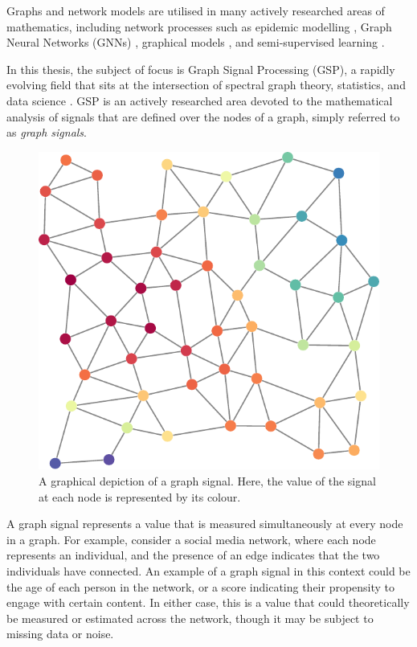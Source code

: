 Graphs and network models are utilised in many actively researched areas of mathematics, including network processes such as epidemic modelling \citep{Pare2020}, Graph Neural Networks (GNNs) \citep{Zhou2020}, graphical models \citep{Holmes2008}, and semi-supervised learning \citep{Chong2020}.

\vspace{0.1cm}

In this thesis, the subject of focus is Graph Signal Processing (GSP), a rapidly evolving field that sits at the intersection of spectral graph theory, statistics, and data science \citep{Ortega2018}. GSP is an actively researched area devoted to the mathematical analysis of signals that are defined over the nodes of a graph, simply referred to as \textit{graph signals}. \phantom{In this thesis we are  }

\newpage

\begin{figure}
	\centering
		\includegraphics[width=\linewidth]{Figures/graph_signal_plot.pdf}
	\caption[A graphical depiction of a graph signal]{A graphical depiction of a graph signal. Here, the value of the signal at each node is represented by its colour.}
	\label{fig:graph_signal}
\end{figure}
 

A graph signal represents a value that is measured simultaneously at every node in a graph. For example, consider a social media network, where each node represents an individual, and the presence of an edge indicates that the two individuals have connected. An example of a graph signal in this context could be the age of each person in the network, or a score indicating their propensity to engage with certain content. In either case, this is a value that could theoretically be measured or estimated across the network, though it may be subject to missing data or noise. 

